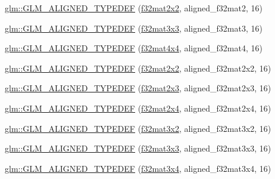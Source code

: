 \begin{DoxyCompactItemize}
\item 
\hyperlink{group__gtx__type__aligned_ga65ff0d690a34a4d7f46f9b2eb51525ee}{glm\+::\+G\+L\+M\+\_\+\+A\+L\+I\+G\+N\+E\+D\+\_\+\+T\+Y\+P\+E\+D\+EF} (\hyperlink{group__gtc__type__precision_ga3c0ffd3a47ae47ff05d5ea6e90825caa}{f32mat2x2}, aligned\+\_\+f32mat2, 16)
\item 
\hyperlink{group__gtx__type__aligned_gadd8ddbe2bf65ccede865ba2f510176dc}{glm\+::\+G\+L\+M\+\_\+\+A\+L\+I\+G\+N\+E\+D\+\_\+\+T\+Y\+P\+E\+D\+EF} (\hyperlink{group__gtc__type__precision_ga177c076d6d9aea27a5ae87b52607e57a}{f32mat3x3}, aligned\+\_\+f32mat3, 16)
\item 
\hyperlink{group__gtx__type__aligned_gaf18dbff14bf13d3ff540c517659ec045}{glm\+::\+G\+L\+M\+\_\+\+A\+L\+I\+G\+N\+E\+D\+\_\+\+T\+Y\+P\+E\+D\+EF} (\hyperlink{group__gtc__type__precision_ga2ba95a5c37eef05b26ac10e03daa5c84}{f32mat4x4}, aligned\+\_\+f32mat4, 16)
\item 
\hyperlink{group__gtx__type__aligned_ga66339f6139bf7ff19e245beb33f61cc8}{glm\+::\+G\+L\+M\+\_\+\+A\+L\+I\+G\+N\+E\+D\+\_\+\+T\+Y\+P\+E\+D\+EF} (\hyperlink{group__gtc__type__precision_ga3c0ffd3a47ae47ff05d5ea6e90825caa}{f32mat2x2}, aligned\+\_\+f32mat2x2, 16)
\item 
\hyperlink{group__gtx__type__aligned_ga1558a48b3934011b52612809f443e46d}{glm\+::\+G\+L\+M\+\_\+\+A\+L\+I\+G\+N\+E\+D\+\_\+\+T\+Y\+P\+E\+D\+EF} (\hyperlink{group__gtc__type__precision_ga1f5a1129669d427f5fbc5f02ff52c366}{f32mat2x3}, aligned\+\_\+f32mat2x3, 16)
\item 
\hyperlink{group__gtx__type__aligned_gaa52e5732daa62851627021ad551c7680}{glm\+::\+G\+L\+M\+\_\+\+A\+L\+I\+G\+N\+E\+D\+\_\+\+T\+Y\+P\+E\+D\+EF} (\hyperlink{group__gtc__type__precision_ga56deb277c1d5c1f42a80982372b4ed6c}{f32mat2x4}, aligned\+\_\+f32mat2x4, 16)
\item 
\hyperlink{group__gtx__type__aligned_gac09663c42566bcb58d23c6781ac4e85a}{glm\+::\+G\+L\+M\+\_\+\+A\+L\+I\+G\+N\+E\+D\+\_\+\+T\+Y\+P\+E\+D\+EF} (\hyperlink{group__gtc__type__precision_ga924b933089d954df062aa8d0735fc005}{f32mat3x2}, aligned\+\_\+f32mat3x2, 16)
\item 
\hyperlink{group__gtx__type__aligned_ga3f510999e59e1b309113e1d561162b29}{glm\+::\+G\+L\+M\+\_\+\+A\+L\+I\+G\+N\+E\+D\+\_\+\+T\+Y\+P\+E\+D\+EF} (\hyperlink{group__gtc__type__precision_ga177c076d6d9aea27a5ae87b52607e57a}{f32mat3x3}, aligned\+\_\+f32mat3x3, 16)
\item 
\hyperlink{group__gtx__type__aligned_ga2c9c94f0c89cd71ce56551db6cf4aaec}{glm\+::\+G\+L\+M\+\_\+\+A\+L\+I\+G\+N\+E\+D\+\_\+\+T\+Y\+P\+E\+D\+EF} (\hyperlink{group__gtc__type__precision_ga8459d79e94eb107e31f0ee600e9bae3f}{f32mat3x4}, aligned\+\_\+f32mat3x4, 16)

\end{DoxyCompactItemize}
